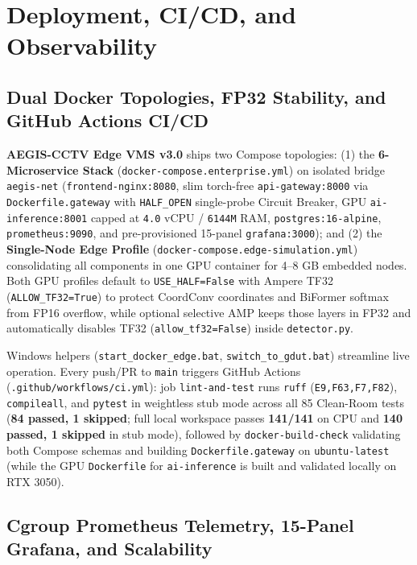 \section{Deployment, CI/CD, and Observability}

\subsection{Dual Docker Topologies, FP32 Stability, and GitHub Actions CI/CD}

\textbf{AEGIS-CCTV Edge VMS v3.0} ships two Compose topologies: (1) the \textbf{6-Microservice Stack} (\nolinkurl{docker-compose.enterprise.yml}) on isolated bridge \texttt{aegis-net} (\texttt{frontend-nginx:8080}, slim torch-free \texttt{api-gateway:8000} via \nolinkurl{Dockerfile.gateway} with \texttt{HALF\_OPEN} single-probe Circuit Breaker, GPU \texttt{ai-inference:8001} capped at \texttt{4.0} vCPU / \texttt{6144M} RAM, \texttt{postgres:16-alpine}, \texttt{prometheus:9090}, and pre-provisioned 15-panel \texttt{grafana:3000}); and (2) the \textbf{Single-Node Edge Profile} (\nolinkurl{docker-compose.edge-simulation.yml}) consolidating all components in one GPU container for 4--8 GB embedded nodes. Both GPU profiles default to \texttt{USE\_HALF=False} with Ampere TF32 (\nolinkurl{ALLOW_TF32=True}) to protect CoordConv coordinates and BiFormer softmax from FP16 overflow, while optional selective AMP keeps those layers in FP32 and automatically disables TF32 (\nolinkurl{allow_tf32=False}) inside \nolinkurl{detector.py}.

Windows helpers (\nolinkurl{start_docker_edge.bat}, \nolinkurl{switch_to_gdut.bat}) streamline live operation. Every push/PR to \texttt{main} triggers GitHub Actions (\nolinkurl{.github/workflows/ci.yml}): job \texttt{lint-and-test} runs \texttt{ruff} (\texttt{E9,F63,F7,F82}), \texttt{compileall}, and \texttt{pytest} in weightless stub mode across all 85 Clean-Room tests (\textbf{84 passed, 1 skipped}; full local workspace passes \textbf{141/141} on CPU and \textbf{140 passed, 1 skipped} in stub mode), followed by \texttt{docker-build-check} validating both Compose schemas and building \nolinkurl{Dockerfile.gateway} on \texttt{ubuntu-latest} (while the GPU \texttt{Dockerfile} for \texttt{ai-inference} is built and validated locally on RTX 3050).

\subsection{Cgroup Prometheus Telemetry, 15-Panel Grafana, and Scalability}

